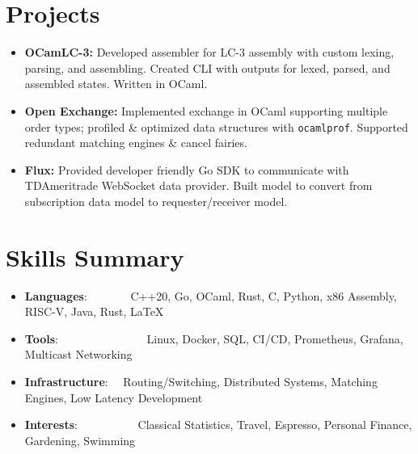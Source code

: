 \documentclass[a4paper,11pt]{extarticle}
\newcommand{\resumeSkillItem}[2]{
	\item\small{
		\textbf{#1}{: #2 \vspace{-2pt}}
	}
}
\newcommand{\resumeSubItem}[2]{\resumeSkillItem{#1}{#2}\vspace{-5pt}}
\newcommand{\resumeSubHeadingListStart}{
    \begin{itemize}[leftmargin=0.15in,label={}]}
\newcommand{\resumeSubHeadingListEnd}{\end{itemize}}
\begin{document}
\section{Projects}
    \noindent
    \begin{itemize}
        \vspace{-1.5mm}
        \item{\textbf{OCamLC-3:} Developed assembler for LC-3 assembly with
                custom lexing, parsing, and assembling. Created CLI with
                outputs for lexed, parsed, and assembled states. Written
                in OCaml.
        }
        \vspace{-1mm}
        \item{\textbf{Open Exchange:} Implemented exchange in OCaml
                supporting multiple order types; profiled \& optimized data
                structures with \texttt{ocamlprof}. Supported redundant
                matching engines \& cancel fairies.
        }
        \vspace{-1mm}
        \item{\textbf{Flux:} Provided developer friendly Go SDK to communicate
                with TDAmeritrade WebSocket data provider. Built model to
                convert from subscription data model to requester/receiver
                model. 
        }
    \end{itemize}

\section{Skills Summary}
	\resumeSubHeadingListStart
		\resumeSubItem{Languages}
            {\hspace{0.6mm}~~~~~~~C++20, Go, OCaml, Rust, C, Python, x86
                Assembly, RISC-V, Java, Rust, \LaTeX}
		\resumeSubItem{Tools}
            {\hspace{0.3mm}~~~~~~~~~~~~~~~Linux, Docker, SQL, CI/CD, Prometheus,
            Grafana, Multicast Networking}
		\resumeSubItem{Infrastructure}
            {~~Routing/Switching, Distributed Systems, Matching Engines, Low
            Latency Development}
        \resumeSubItem{Interests}
            {~~~~~~~~~~Classical Statistics, Travel, Espresso, Personal Finance,
            Gardening, Swimming}

        \begin{comment}
		\resumeSubItem{Finance}
			{\hspace{0.7mm}~~~~~~~~~~~Futures, Options, Stochastics, Hypothesis
				Testing, Commodities, Volatility}
        \end{comment}


	\resumeSubHeadingListEnd
\end{document}
